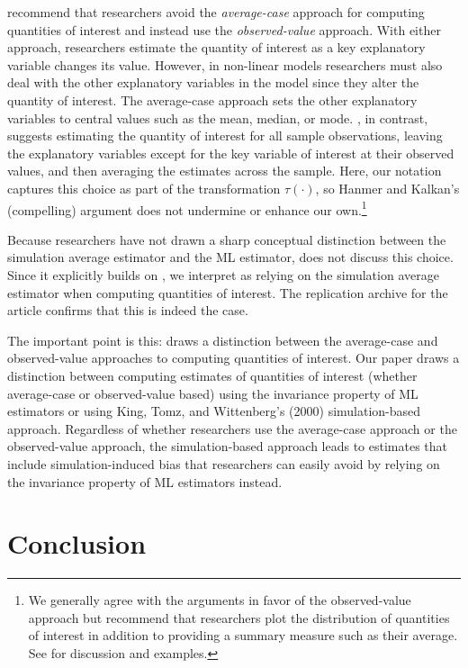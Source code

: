 \documentclass[11pt]{article}
\begin{document}
\cite{HanmerKalkan2013} recommend that researchers avoid the {\it average-case} approach for computing quantities of interest and instead use the {\it observed-value} approach. With either approach, researchers estimate the quantity of interest as a key explanatory variable changes its value. However, in non-linear models researchers must also deal with the other explanatory variables in the model since they alter the quantity of interest. The average-case approach sets the other explanatory variables to central values such as the mean, median, or mode. \cite{HanmerKalkan2013}, in contrast, suggests estimating the quantity of interest for all sample observations, leaving the explanatory variables except for the key variable of interest at their observed values, and then averaging the estimates across the sample. Here, our notation captures this choice as part of the transformation $\tau(\cdot)$, so Hanmer and Kalkan's (compelling) argument does not undermine or enhance our own.\footnote{We generally agree with the arguments in favor of the observed-value approach but recommend that researchers plot the distribution of quantities of interest in addition to providing a summary measure such as their average. See \cite{AiNorton2003} for discussion and examples.}


Because researchers have not drawn a sharp conceptual distinction between the simulation average estimator and the ML estimator, \cite{HanmerKalkan2013} does not discuss this choice. Since it explicitly builds on \cite{KingTomzWittenberg2000}, we interpret \cite{HanmerKalkan2013} as relying on the simulation average estimator when computing quantities of interest. The replication archive for the article confirms that this is indeed the case.


The important point is this: \cite{HanmerKalkan2013} draws a distinction between the average-case and observed-value approaches to computing quantities of interest. Our paper draws a distinction between computing estimates of quantities of interest (whether average-case or observed-value based) using the invariance property of ML estimators or using King, Tomz, and Wittenberg's (2000) simulation-based approach. Regardless of whether researchers use the average-case approach or the observed-value approach, the simulation-based approach leads to estimates that include simulation-induced bias that researchers can easily avoid by relying on the invariance property of ML estimators instead.


\section*{Conclusion}
\end{document}
